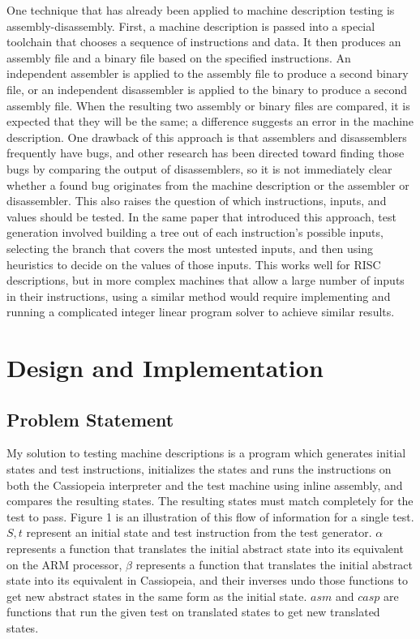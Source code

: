\documentclass[letterpaper,12pt]{article}
\begin{document}
One technique that has already been applied to machine description testing is assembly-disassembly. First, a machine description is passed into a special toolchain that chooses a sequence of instructions and data. It then produces an assembly file and a binary file based on the specified instructions. An independent assembler is applied to the assembly file to produce a second binary file, or an independent disassembler is applied to the binary to produce a second assembly file. When the resulting two assembly or binary files are compared, it is expected that they will be the same; a difference suggests an error in the machine description. One drawback of this approach is that assemblers and disassemblers frequently have bugs, and other research has been directed toward finding those bugs by comparing the output of disassemblers\cite{Nvd}, so it is not immediately clear whether a found bug originates from the machine description or the assembler or disassembler. This also raises the question of which instructions, inputs, and values should be tested. In the same paper that introduced this approach, test generation involved building a tree out of each instruction's possible inputs, selecting the branch that covers the most untested inputs, and then using heuristics to decide on the values of those inputs\cite{Checker}. This works well for RISC descriptions, but in more complex machines that allow a large number of inputs in their instructions, using a similar method would require implementing and running a complicated integer linear program solver to achieve similar results.

\section{Design and Implementation}

\subsection{Problem Statement}

My solution to testing machine descriptions is a program which generates initial states and test instructions, initializes the states and runs the instructions on both the Cassiopeia interpreter and the test machine using inline assembly, and compares the resulting states. The resulting states must match completely for the test to pass. Figure 1 is an illustration of this flow of information for a single test. $S, t$ represent an initial state and test instruction from the test generator. $\alpha$ represents a function that translates the initial abstract state into its equivalent on the ARM processor, $\beta$ represents a function that translates the initial abstract state into its equivalent in Cassiopeia, and their inverses undo those functions to get new abstract states in the same form as the initial state. $asm$ and $casp$ are functions that run the given test on translated states to get new translated states.
\end{document}
